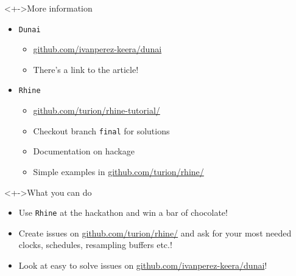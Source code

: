\documentclass[handout]{enigtex-beamer-base}
\begin{document}
\begin{frame}
	\begin{block}<+->{More information}
		\begin{itemize}
			\item \texttt{Dunai}
			\begin{itemize}
				\item  \href{https://github.com/ivanperez-keera/dunai}{github.com/ivanperez-keera/dunai}
				\item There's a link to the article!
			\end{itemize}
			\item \texttt{Rhine}
			\begin{itemize}
				\item \href{https://github.com/turion/rhine-tutorial/}{github.com/turion/rhine-tutorial/}
				\item Checkout branch \texttt{final} for solutions
				\item Documentation on hackage
				\item Simple examples in \href{https://github.com/turion/rhine/}{github.com/turion/rhine/}
			\end{itemize}
		\end{itemize}
	\end{block}
	\begin{block}<+->{What you can do}
		\begin{itemize}
			\item Use \texttt{Rhine} at the hackathon and win a bar of chocolate!
			\item Create issues on \href{https://github.com/turion/rhine/}{github.com/turion/rhine/} and ask for your most needed clocks, schedules, resampling buffers etc.!
			\item Look at easy to solve issues on \href{https://github.com/ivanperez-keera/dunai}{github.com/ivanperez-keera/dunai}!
		\end{itemize}
	\end{block}
\end{frame}
\end{document}
